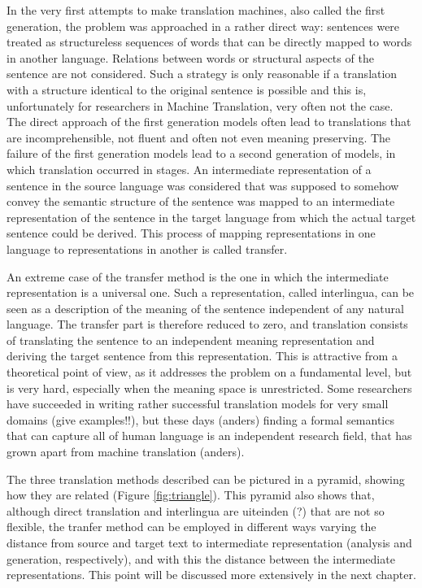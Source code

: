 \documentclass{report}
\theoremstyle{indented}
\begin{document}
In the very first attempts to make translation machines, also called the first generation, the problem was approached in a rather direct way: sentences were treated as structureless sequences of words that can be directly mapped to words in another language. Relations between words or structural aspects of the sentence are not considered. Such a strategy is only reasonable if a translation with a structure identical to the original sentence is possible and this is, unfortunately for researchers in Machine Translation, very often not the case. The direct approach of the first generation models often lead to translations that are incomprehensible, not fluent and often not even meaning preserving.
The failure of the first generation models lead to a second generation of models, in which translation occurred in stages. An intermediate representation of a sentence in the source language was considered that was supposed to somehow convey the semantic structure of the sentence was mapped to an intermediate representation of the sentence in the target language from which the actual target sentence could be derived. This process of mapping representations in one language to representations in another is called transfer.

An extreme case of the transfer method is the one in which the intermediate representation is a universal one. Such a representation, called interlingua, can be seen as a description of the meaning of the sentence independent of any natural language. The transfer part is therefore reduced to zero, and translation consists of translating the sentence to an independent meaning representation and deriving the target sentence from this representation. This is attractive from a theoretical point of view, as it addresses the problem on a fundamental level, but is very hard, especially when the meaning space is unrestricted. Some researchers have succeeded in writing rather successful translation models for very small domains (give examples!!), but these days (anders) finding a formal semantics that can capture all of human language is an independent research field, that has grown apart from machine translation (anders).

The three translation methods described can be pictured in a pyramid, showing how they are related (Figure \ref{fig:triangle}). This pyramid also shows that, although direct translation and interlingua are uiteinden (?) that are not so flexible, the tranfer method can be employed in different ways varying the distance from source and target text to intermediate representation (analysis and generation, respectively), and with this the distance between the intermediate representations. This point will be discussed more extensively in the next chapter.
\end{document}
